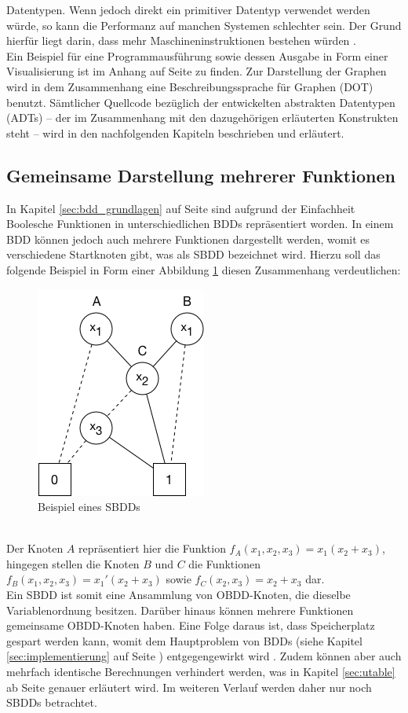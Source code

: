 Datentypen. Wenn jedoch direkt ein primitiver Datentyp verwendet werden würde, so kann die Performanz auf manchen Systemen schlechter sein. Der Grund hierfür liegt darin, dass mehr Maschineninstruktionen bestehen würden \cite{l2015}.\\
Ein Beispiel für eine Programmausführung sowie dessen Ausgabe in Form einer Visualisierung ist im Anhang auf Seite \pageref{sec:program} zu finden. Zur Darstellung der Graphen wird in dem Zusammenhang eine Beschreibungssprache für Graphen (DOT) \cite{gkn2015} benutzt. Sämtlicher Quellcode bezüglich der entwickelten abstrakten Datentypen (ADTs) -- der im Zusammenhang mit den dazugehörigen erläuterten Konstrukten steht -- wird in den nachfolgenden Kapiteln beschrieben und erläutert.
\subsection{Gemeinsame Darstellung mehrerer Funktionen}
\label{sec:sbdds}
In Kapitel \ref{sec:bdd_grundlagen} auf Seite \pageref{sec:bdd_grundlagen} sind aufgrund der Einfachheit Boolesche Funktionen in unterschiedlichen BDDs repräsentiert worden. In einem BDD können jedoch auch mehrere Funktionen dargestellt werden, womit es verschiedene Startknoten gibt, was als SBDD bezeichnet wird. Hierzu soll das folgende Beispiel in Form einer Abbildung \ref{fig:sbdd} diesen Zusammenhang verdeutlichen:
\begin{figure}[bth]
	\centering
	\includegraphics[scale=0.5]{./img/shared}
	\caption[Beispiel eines SBDDs]{Beispiel eines SBDDs}
	\label{fig:sbdd}
\end{figure}\\
\noindent
Der Knoten $A$ repräsentiert hier die Funktion $f_A(x_1, x_2, x_3) = x_1(x_2 + x_3)$, hingegen stellen die Knoten $B$ und $C$ die Funktionen $f_B(x_1, x_2, x_3) = x_1'(x_2+x_3)$ sowie $f_C(x_2, x_3)=x_2 + x_3$ dar.\\ 
Ein SBDD ist somit eine Ansammlung von OBDD-Knoten, die dieselbe Variablenordnung besitzen. Darüber hinaus können mehrere Funktionen gemeinsame OBDD-Knoten haben. Eine Folge daraus ist, dass Speicherplatz gespart werden kann, womit dem Hauptproblem von BDDs (siehe Kapitel \ref{sec:implementierung} auf Seite \pageref{sec:implementierung}) entgegengewirkt wird \cite{miy1990}. Zudem können aber auch mehrfach identische Berechnungen verhindert werden, was in Kapitel \ref{sec:utable} ab Seite \pageref{sec:utable} genauer erläutert wird. Im weiteren Verlauf werden daher nur noch SBDDs betrachtet.

